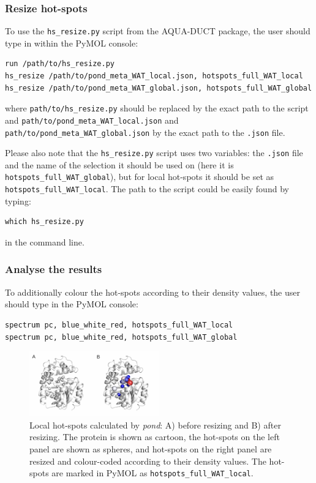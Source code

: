\documentclass[9pt,tutorial]{livecoms}
\begin{document}
\subsubsection{Resize hot-spots}
To use the \texttt{hs\_resize.py} script from the AQUA-DUCT package, the user should type in within the PyMOL console:
\begin{lstlisting}[columns=fullflexible]
run /path/to/hs_resize.py
hs_resize /path/to/pond_meta_WAT_local.json, hotspots_full_WAT_local
hs_resize /path/to/pond_meta_WAT_global.json, hotspots_full_WAT_global
\end{lstlisting}
where \texttt{path/to/hs\_resize.py} should be replaced by the exact path to the script and \texttt{path/to/pond\_meta\_WAT\_local.json} and \texttt{path/to/pond\_meta\_WAT\_global.json} by the exact path to the \texttt{.json} file. 

Please also note that the \texttt{hs\_resize.py} script uses two variables: the \texttt{.json} file and the name of the selection it should be used on (here it is \texttt{hotspots\_full\_WAT\_global}), but for local hot-spots it should be set as \texttt{hotspots\_full\_WAT\_local}.
The path to the script could be easily found by typing:
\begin{lstlisting}
which hs_resize.py
\end{lstlisting}
in the command line.

\subsubsection{Analyse the results}
To additionally colour the hot-spots according to their density values, the user should type in the PyMOL console:
\begin{lstlisting}[columns=fullflexible]
spectrum pc, blue_white_red, hotspots_full_WAT_local
spectrum pc, blue_white_red, hotspots_full_WAT_global
\end{lstlisting}

\begin{figure}[ht!]
\centering
\includegraphics[width=0.5\textwidth]{Tut4.3.png}
\caption{Local hot-spots calculated by \textit{pond}: A) before resizing and B) after resizing. The protein is shown as cartoon, the hot-spots on the left panel are shown as spheres, and hot-spots on the right panel are resized and colour-coded according to their density values. The hot-spots are marked in PyMOL as \texttt{hotspots\_full\_WAT\_local}.}
\label{Tut4.3}
\end{figure}
\end{document}
